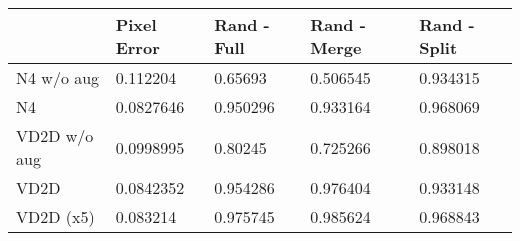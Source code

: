 \begin{tabular}{lllll}
\toprule
{} & Pixel Error & Rand - Full & Rand - Merge & Rand - Split \\
\midrule
N4 w/o aug   &    0.112204 &     0.65693 &     0.506545 &     0.934315 \\
N4           &   0.0827646 &    0.950296 &     0.933164 &     0.968069 \\
VD2D w/o aug &   0.0998995 &     0.80245 &     0.725266 &     0.898018 \\
VD2D         &   0.0842352 &    0.954286 &     0.976404 &     0.933148 \\
VD2D (x5)    &    0.083214 &    0.975745 &     0.985624 &     0.968843 \\
\bottomrule
\end{tabular}
